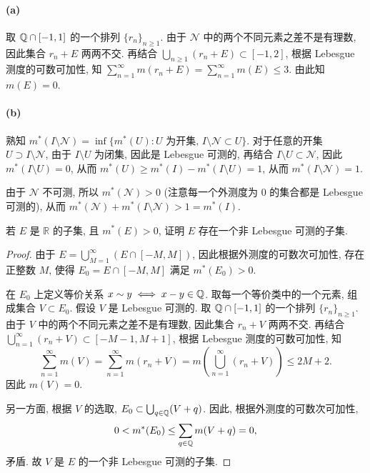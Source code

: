 \documentclass{article}
\begin{document}
\begin{solution}
	\paragraph{(a)} 取 $\mathbb{Q} \cap [-1,1]$ 的一个排列 $\{r_n\}_{n \ge 1}$. 由于 $\mathcal{N}$ 中的两个不同元素之差不是有理数, 因此集合 $r_n + E$ 两两不交. 再结合 $\bigcup_{n \ge 1} (r_n + E) \subset [-1, 2]$, 根据 Lebesgue 测度的可数可加性, 知 $\sum_{n=1}^{\infty} m(r_n + E) = \sum_{n=1}^{\infty} m(E) \le 3$. 由此知 $m(E) = 0$.

	\paragraph{(b)} 熟知 $m^*(I \setminus \mathcal{N}) = \inf \{m^*(U): U \text{ 为开集, } I \setminus \mathcal{N} \subset U\}$. 对于任意的开集 $U \supset I \setminus \mathcal{N}$, 由于 $I \setminus U$ 为闭集, 因此是 Lebesgue 可测的, 再结合 $I \setminus U \subset \mathcal{N}$, 因此 $m^*(I \setminus U) = 0$, 从而 $m^*(U) \ge m^*(I) - m^*(I \setminus U) = 1$, 从而 $m^*(I \setminus \mathcal{N}) = 1$. 

	由于 $\mathcal{N}$ 不可测, 所以 $m^*(\mathcal{N}) > 0$ (注意每一个外测度为 $0$ 的集合都是 Lebesgue 可测的), 从而 $m^*(\mathcal{N}) + m^*(I \setminus \mathcal{N}) > 1 = m^*(I)$. 
\end{solution}



\begin{problem}
  若 $E$ 是 $\mathbb{R}$ 的子集, 且 $m^*(E)>0$, 证明 $E$ 存在一个非 Lebesgue 可测的子集.
\end{problem}

\begin{proof}
	由于 $E = \bigcup_{M=1}^{\infty} (E \cap [-M,M])$, 因此根据外测度的可数次可加性, 存在正整数 $M$, 使得 $E_0 = E \cap [-M,M]$ 满足 $m^*(E_0) > 0$.

	在 $E_0$ 上定义等价关系 $x \sim y \iff x-y \in \mathbb{Q}$. 取每一个等价类中的一个元素, 组成集合 $V \subset E_0$. 假设 $V$ 是 Lebesgue 可测的. 取 $\mathbb{Q} \cap [-1,1]$ 的一个排列 $\{r_n\}_{n \ge 1}$. 由于 $V$ 中的两个不同元素之差不是有理数, 因此集合 $r_n + V$ 两两不交. 再结合 $\bigcup_{n=1}^{\infty} (r_n + V) \subset [-M-1,M+1]$, 根据 Lebesgue 测度的可数可加性, 知
	\[ \sum_{n=1}^{\infty} m(V) = \sum_{n=1}^{\infty} m(r_n + V) = m \left( \bigcup_{n=1}^{\infty} (r_n + V) \right) \le 2M+2. \]
	因此 $m(V) = 0$.

	另一方面, 根据 $V$ 的选取, $E_0 \subset \bigcup_{q \in \mathbb{Q}} (V+q)$. 因此, 根据外测度的可数次可加性,
	\[ 0 < m^*(E_0) \le \sum_{q \in \mathbb{Q}} m(V+q) = 0, \]
	矛盾. 故 $V$ 是 $E$ 的一个非 Lebesgue 可测的子集.
\end{proof}
\end{document}
